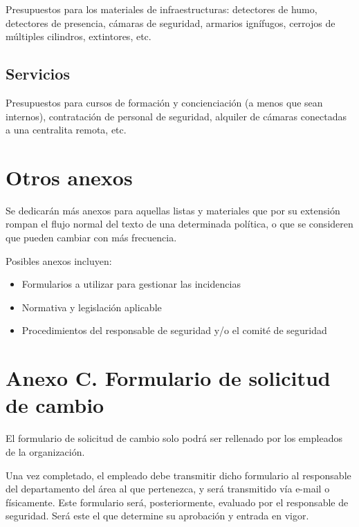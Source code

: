 \documentclass[11pt,bibtotoc,noliststotoc,BCOR0mm]{scrbook}
\begin{document}
Presupuestos para los materiales de infraestructuras: detectores de
humo, detectores de presencia, cámaras de seguridad, armarios
ignífugos, cerrojos de múltiples cilindros, extintores, etc.

\section{Servicios}

Presupuestos para cursos de formación y concienciación (a menos que
sean internos), contratación de personal de seguridad, alquiler de
cámaras conectadas a una centralita remota, etc.


\chapter{Otros anexos}

Se dedicarán más anexos para aquellas listas y materiales que por su
extensión rompan el flujo normal del texto de una determinada
política, o que se consideren que pueden cambiar con más frecuencia.

Posibles anexos incluyen:

\begin{itemize}
\item Formularios a utilizar para gestionar las incidencias
\item Normativa y legislación aplicable
\item Procedimientos del responsable de seguridad y/o el comité de seguridad
\end{itemize}

\chapter{Anexo C. Formulario de solicitud de cambio}

El formulario de solicitud de cambio solo podrá ser rellenado por los empleados de la organización.

Una vez completado, el empleado debe transmitir dicho formulario al responsable del departamento del área al que pertenezca, y será transmitido vía e-mail o físicamente. Este formulario será, posteriormente, evaluado por el responsable de seguridad. Será este el que determine su aprobación y entrada en vigor.



\backmatter


\end{document}
